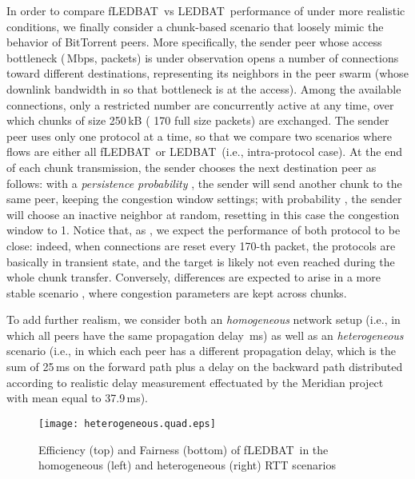 \documentclass[conference]{IEEEtran}
\newcommand{\figLC}[2]{
        \caption{#2}
        \label{fig:#1}
        \vspace{-5pt}
}
\newcommand{\btledbat}[0]{LEDBAT}
\newcommand{\fledbat}[0]{fLEDBAT}
\begin{document}
In order to compare \fledbat\ vs \btledbat\ performance of under more realistic conditions, we
finally consider a chunk-based scenario that loosely mimic the behavior of BitTorrent peers.
More specifically, the sender peer whose access bottleneck (\,Mbps,  packets)
is under observation opens a number  of connections toward different destinations,
representing its neighbors in the peer swarm (whose downlink bandwidth in  so that
bottleneck is at the access). Among the available connections, only a restricted number 
are concurrently active at any time, over which chunks of size  250\,kB ( 170 full size packets) are exchanged. The
sender peer uses only one protocol at a time, so that we compare two scenarios where flows
are either all \fledbat\ or \btledbat\ (i.e., intra-protocol case).
At the end of each chunk transmission, the sender chooses the next destination peer as follows:
with a \emph{persistence probability} , the sender will send another chunk to the same
peer, keeping the congestion window settings; with probability , the sender will
choose an inactive neighbor at random, resetting in this case the congestion window to 1.
Notice that, as , we expect the performance of both protocol to be close:
indeed, when connections are reset every 170-th packet, the protocols are basically in transient
state, and the target is likely not even reached during the whole chunk transfer. Conversely,
differences are expected to arise in a more stable scenario , where congestion
parameters are kept across chunks.

To add further realism, we consider both an \emph{homogeneous} network setup (i.e., in which
all peers have the same propagation delay \,ms) as well as an \emph{heterogeneous} scenario
(i.e., in which each peer has a different propagation delay, which is the sum of 25\,ms on the 
forward path plus a delay on the backward path distributed according to realistic delay measurement 
effectuated by the Meridian project~\cite{meridian} with mean equal to 37.9\,ms).

\begin{figure}[t]
    \begin{center}
        \texttt{[image: heterogeneous.quad.eps]}
        \figLC{realisticRTT}{Efficiency (top) and Fairness (bottom) of \fledbat\ in the homogeneous (left) and heterogeneous (right) RTT scenarios}
    \end{center}
\vspace{-4mm}
\end{figure}
\end{document}
